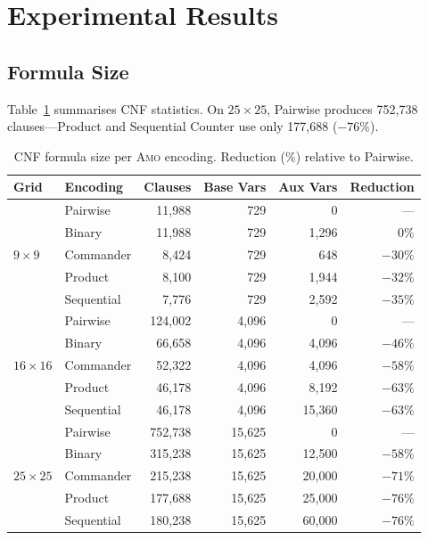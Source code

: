 \documentclass[preprint,10pt,authoryear]{elsarticle}
\newcommand{\AMO}{\textsc{Amo}}
\begin{document}
\section{Experimental Results}
\label{sec:results}

\subsection{Formula Size}

Table~\ref{tab:formula} summarises CNF statistics.
On $25\!\times\!25$, Pairwise produces 752,738 clauses---Product and
Sequential Counter use only 177,688 ($-76\%$).

\begin{table}[H]
\centering
\caption{CNF formula size per \AMO{} encoding.
Reduction (\%) relative to Pairwise.}
\label{tab:formula}
\small
\begin{tabular}{llrrrr}
\toprule
\textbf{Grid} & \textbf{Encoding}
  & \textbf{Clauses} & \textbf{Base Vars}
  & \textbf{Aux Vars} & \textbf{Reduction}\\
\midrule
\multirow{5}{*}{$9\times9$}
 & Pairwise   &  11,988 &   729 &      0 & ---     \\
 & Binary     &  11,988 &   729 &  1,296 &  $0\%$  \\
 & Commander  &   8,424 &   729 &    648 & $-30\%$ \\
 & Product    &   8,100 &   729 &  1,944 & $-32\%$ \\
 & Sequential &   7,776 &   729 &  2,592 & $-35\%$ \\
\midrule
\multirow{5}{*}{$16\times16$}
 & Pairwise   & 124,002 & 4,096 &      0 & ---     \\
 & Binary     &  66,658 & 4,096 &  4,096 & $-46\%$ \\
 & Commander  &  52,322 & 4,096 &  4,096 & $-58\%$ \\
 & Product    &  46,178 & 4,096 &  8,192 & $-63\%$ \\
 & Sequential &  46,178 & 4,096 & 15,360 & $-63\%$ \\
\midrule
\multirow{5}{*}{$25\times25$}
 & Pairwise   & 752,738 & 15,625 &      0 & ---     \\
 & Binary     & 315,238 & 15,625 & 12,500 & $-58\%$ \\
 & Commander  & 215,238 & 15,625 & 20,000 & $-71\%$ \\
 & Product    & 177,688 & 15,625 & 25,000 & $-76\%$ \\
 & Sequential & 180,238 & 15,625 & 60,000 & $-76\%$ \\
\bottomrule
\end{tabular}
\end{table}
\end{document}
